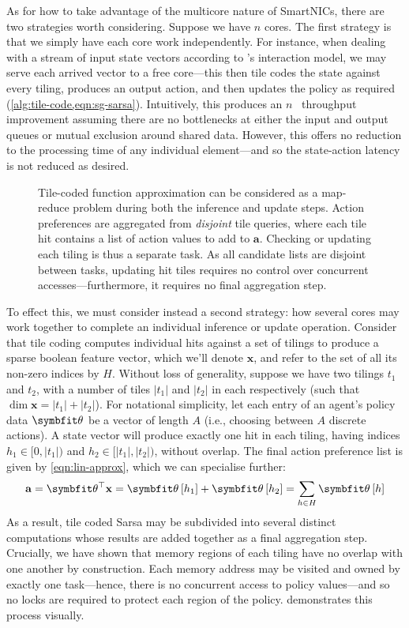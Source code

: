 As for how to take advantage of the multicore nature of SmartNICs, there are two strategies worth considering.
Suppose we have $n$ cores.
The first strategy is that we simply have each core work independently.
For instance, when dealing with a stream of input state vectors according to \approachshort{}'s interaction model, we may serve each arrived vector to a free core---this then tile codes the state against every tiling, produces an output action, and then updates the policy as required (\cref{alg:tile-code,eqn:sg-sarsa}).
Intuitively, this produces an $n$~\unit{\times} throughput improvement assuming there are no bottlenecks at either the input and output queues or mutual exclusion around shared data.
However, this offers no reduction to the processing time of any individual element---and so the state-action latency is not reduced as desired.

\begin{figure}
	\centering
	\resizebox{0.67\linewidth}{!}{
		
	}
	\caption[A visualisation of how tile-coding can be split into subtasks as a map-reduce problem.]{Tile-coded function approximation can be considered as a map-reduce problem during both the inference and update steps. Action preferences are aggregated from \emph{disjoint} tile queries, where each tile hit contains a list of action values to add to $\mathbf{a}$. Checking or updating each tiling is thus a separate task. As all candidate lists are disjoint between tasks, updating hit tiles requires no control over concurrent accesses---furthermore, it requires no final aggregation step.\label{fig:opal-par-tilecode}}
\end{figure}

To effect this, we must consider instead a second strategy: how several cores may work together to complete an individual inference or update operation.
Consider that tile coding computes individual hits against a set of tilings to produce a sparse boolean feature vector, which we'll denote $\mathbf{x}$, and refer to the set of all its non-zero indices by $H$.
Without loss of generality, suppose we have two tilings $t_1$ and $t_2$, with a number of tiles $|t_1|$ and $|t_2|$ in each respectively (such that $\dim{\mathbf{x}}=|t_1|+|t_2|$).
For notational simplicity, let each entry of an agent's policy data $\wvec{}$ be a vector of length $A$ (i.e., choosing between $A$ discrete actions).
A state vector will produce exactly one hit in each tiling, having indices $h_1\in[0,|t_1|)$ and $h_2\in[|t_1|,|t_2|)$, without overlap.
The final action preference list is given by \cref{eqn:lin-approx}, which we can specialise further:
$$
\mathbf{a} = \wvec{}^{\top} \mathbf{x} = \wvec{}\left[h_1\right] + \wvec{}\left[h_2\right] = \sum_{h\in{}H}\wvec{}\left[h\right]
$$
As a result, tile coded Sarsa may be subdivided into several distinct computations whose results are added together as a final aggregation step.
Crucially, we have shown that memory regions of each tiling have no overlap with one another by construction.
Each memory address may be visited and owned by exactly one task---hence, there is no concurrent access to policy values---and so no locks are required to protect each region of the policy.
 demonstrates this process visually.

